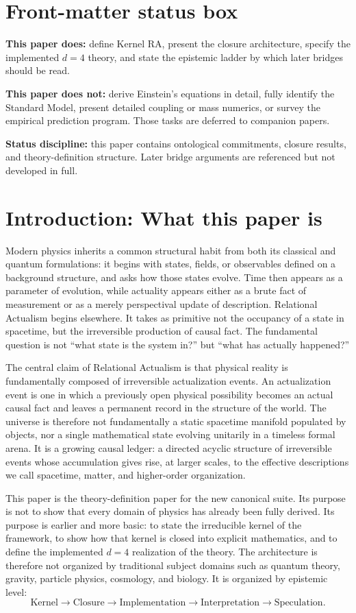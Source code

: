 \documentclass[11pt]{article}
\begin{document}
\section*{Front-matter status box}
\noindent\textbf{This paper does:} define Kernel RA, present the closure architecture, specify the implemented $d=4$ theory, and state the epistemic ladder by which later bridges should be read.

\noindent\textbf{This paper does not:} derive Einstein's equations in detail, fully identify the Standard Model, present detailed coupling or mass numerics, or survey the empirical prediction program. Those tasks are deferred to companion papers.

\noindent\textbf{Status discipline:} this paper contains ontological commitments, closure results, and theory-definition structure. Later bridge arguments are referenced but not developed in full.

\section{Introduction: What this paper is}
Modern physics inherits a common structural habit from both its classical and quantum formulations: it begins with states, fields, or observables defined on a background structure, and asks how those states evolve. Time then appears as a parameter of evolution, while actuality appears either as a brute fact of measurement or as a merely perspectival update of description. Relational Actualism begins elsewhere. It takes as primitive not the occupancy of a state in spacetime, but the irreversible production of causal fact. The fundamental question is not ``what state is the system in?'' but ``what has actually happened?''

The central claim of Relational Actualism is that physical reality is fundamentally composed of irreversible actualization events. An actualization event is one in which a previously open physical possibility becomes an actual causal fact and leaves a permanent record in the structure of the world. The universe is therefore not fundamentally a static spacetime manifold populated by objects, nor a single mathematical state evolving unitarily in a timeless formal arena. It is a growing causal ledger: a directed acyclic structure of irreversible events whose accumulation gives rise, at larger scales, to the effective descriptions we call spacetime, matter, and higher-order organization.

This paper is the theory-definition paper for the new canonical suite. Its purpose is not to show that every domain of physics has already been fully derived. Its purpose is earlier and more basic: to state the irreducible kernel of the framework, to show how that kernel is closed into explicit mathematics, and to define the implemented $d=4$ realization of the theory. The architecture is therefore not organized by traditional subject domains such as quantum theory, gravity, particle physics, cosmology, and biology. It is organized by epistemic level:
\[
\text{Kernel} \to \text{Closure} \to \text{Implementation} \to \text{Interpretation} \to \text{Speculation}.
\]
\end{document}
